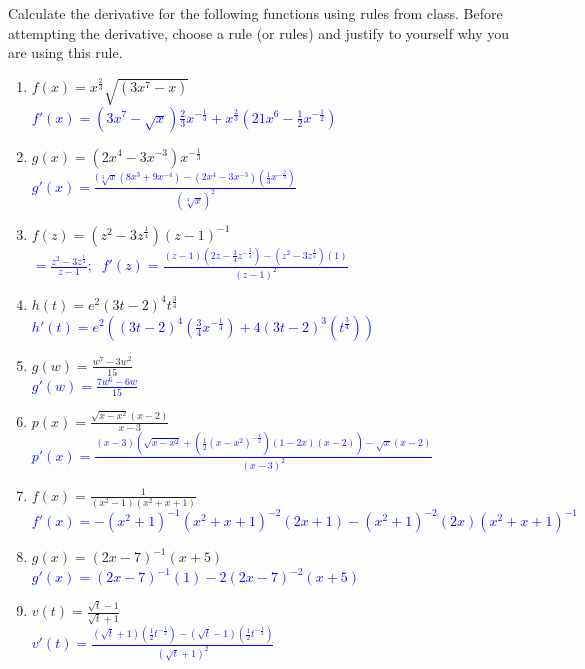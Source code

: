 \documentclass{ximera}
\begin{document}
\begin{exercise}
    Calculate the derivative for the following functions using rules from class.  Before attempting the derivative, choose a rule (or rules) and justify to yourself why you are using this rule. 
    \begin{enumerate}
        \item $f(x)=x^{\frac23}\sqrt{(3x^7-x)}$\\
        \textcolor{blue}{ $f'(x)=(3x^7-\sqrt{x})\frac23x^{-\frac13}+x^{\frac23}(21x^6-\frac{1}{2}x^{-\frac{1}{2}})$}

        \item $g(x)=(2x^4-3x^{-3})x^{-\frac{1}{3}}$\\
        \textcolor{blue}{ $g'(x)=\frac{(\sqrt[3]{x}(8x^3+9x^{-4})-(2x^4-3x^{-3})(\frac{1}{3}x^{-\frac{2}{3}})}{(\sqrt[3]{x})^2}$}

        \item $f(z)=(z^2-3z^{\frac{1}{4}})(z-1)^{-1}$\\
        \textcolor{blue}{ $=\frac{z^2-3z^{\frac{1}{4}}}{z-1};\;\; f'(z)=\frac{(z-1)(2z-\frac{3}{4}z^{-\frac{3}{4}})-(z^2-3z^{\frac{1}{4}})(1)}{(z-1)^2}$}

        \item $h(t)=e^2(3t-2)^{4}t^{\frac{3}{4}}$\\
        \textcolor{blue}{ $h'(t)=e^2((3t-2)^{4}(\frac34x^{-\frac14})+4(3t-2)^{3}(t^{\frac34}))$}

        \item $g(w)=\frac{w^7-3w^2}{15}$ \\
        \textcolor{blue}{ $g'(w)=\frac{7w^6-6w}{15}$}

        \item $p(x)=\frac{\sqrt{x-x^2}(x-2)}{x-3}$   \\
        \textcolor{blue}{ $p'(x)=\frac{(x-3)(\sqrt{x-x^2}+(\frac{1}{2}(x-x^2)^{-\frac{1}{2}})(1-2x)(x-2))-\sqrt{x}(x-2)}{(x-3)^2}$}

        \item $f(x)=\frac{1}{(x^2-1)(x^2+x+1)}$\\
        \textcolor{blue}{ $f'(x)=-(x^2+1)^{-1}(x^2+x+1)^{-2}(2x+1)-(x^2+1)^{-2}(2x)(x^2+x+1)^{-1}$}
        
        \item $g(x)=(2x-7)^{-1}(x+5)$\\
        \textcolor{blue}{ $g'(x)=(2x-7)^{-1}(1)-2(2x-7)^{-2}(x+5)$}

        \item $v(t)=\frac{\sqrt{t}-1}{\sqrt{t}+1}$\\
        \textcolor{blue}{ $v'(t)=\frac{(\sqrt{t}+1)(\frac{1}{2}t^{-\frac12})-(\sqrt{t}-1)(\frac12t^{-\frac12})}{(\sqrt{t}+1)^2}$}

         
    \end{enumerate}


\end{exercise}
\end{document}
